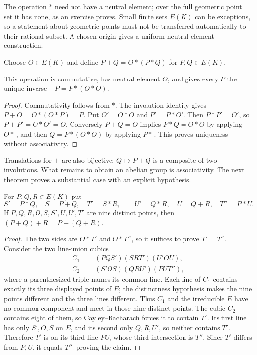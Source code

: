 The operation $*$ need not have a neutral element; over the full geometric point set it has none, as an exercise proves. Small finite sets $E(K)$ can be exceptions, so a statement about geometric points must not be transferred automatically to their rational subset. A chosen origin gives a uniform neutral-element construction.

\begin{definition}
Choose $O\in E(K)$ and define $P+Q=O*(P*Q)$ for $P,Q\in E(K)$.
\end{definition}

\begin{proposition}\label{geometry:prop:groupbasic}
This operation is commutative, has neutral element $O$, and gives every $P$ the unique inverse $-P=P*(O*O)$.
\end{proposition}
\begin{proof}
Commutativity follows from $*$. The involution identity gives $P+O=O*(O*P)=P$. Put $O'=O*O$ and $P'=P*O'$. Then $P*P'=O'$, so $P+P'=O*O'=O$. Conversely $P+Q=O$ implies $P*Q=O*O$ by applying $O*\,$, and then $Q=P*(O*O)$ by applying $P*\,$. This proves uniqueness without associativity.
\end{proof}

Translations for $+$ are also bijective: $Q\mapsto P+Q$ is a composite of two involutions. What remains to obtain an abelian group is associativity. The next theorem proves a substantial case with an explicit hypothesis.

\begin{theorem}\label{geometry:thm:assoc}
For $P,Q,R\in E(K)$ put
\[
S'=P*Q,\quad S=P+Q,\quad T'=S*R,\qquad
U'=Q*R,\quad U=Q+R,\quad T''=P*U.
\]
If $P,Q,R,O,S,S',U,U',T'$ are nine distinct points, then $(P+Q)+R=P+(Q+R)$.
\end{theorem}
\begin{proof}
The two sides are $O*T'$ and $O*T''$, so it suffices to prove $T'=T''$. Consider the two line-union cubics
\[
\begin{aligned}
C_1&=(PQS')(SRT')(U'OU),\\
C_2&=(S'OS)(QRU')(PUT''),
\end{aligned}
\]
where a parenthesized triple names its common line. Each line of $C_1$ contains exactly its three displayed points of $E$; the distinctness hypothesis makes the nine points different and the three lines different. Thus $C_1$ and the irreducible $E$ have no common component and meet in those nine distinct points. The cubic $C_2$ contains eight of them, so Cayley--Bacharach forces it to contain $T'$. Its first line has only $S',O,S$ on $E$, and its second only $Q,R,U'$, so neither contains $T'$. Therefore $T'$ is on its third line $PU$, whose third intersection is $T''$. Since $T'$ differs from $P,U$, it equals $T''$, proving the claim.
\end{proof}

